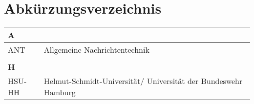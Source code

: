 \chapter*{Abk\"urzungsverzeichnis}
\label{sec:abkuerzungen}
\begin{longtable}[t]{ll}
\arrayrulecolor{hsugrau}
\textbf{\textcolor{hsurot}{A}} &\\ \hline 
ANT & Allgemeine Nachrichtentechnik \\

 
  &\\ \textbf{\textcolor{hsurot}{H}} &\\  \hline 
HSU-HH & Helmut-Schmidt-Universit\"at/ Universit\"at der Bundeswehr Hamburg\\

\end{longtable}